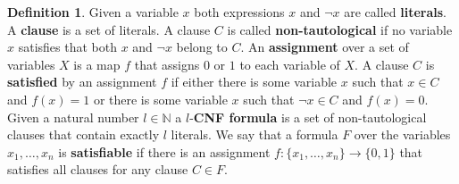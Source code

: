 \documentclass[12pt,notitlepage,a4paper]{article}
\theoremstyle{definition}
\newtheorem{definition}{Definition}[section]
\newcommand{\N}{\mathbb{N}}
\begin{document}
\begin{definition}\label{def:CNF}
Given a variable $x$ both expressions
$x$ and $\neg x$ are called \textbf{literals}. A \textbf{clause}
is a set of literals. A clause $C$ is called \textbf{non-tautological}
if no variable $x$ satisfies that both $x$ and $\neg x$
belong to $C$. An \textbf{assignment} over a set of variables $X$ is a 
map $f$ that assigns $0$ or $1$ to each variable of $X$. A clause $C$
is \textbf{satisfied} by an assignment $f$ if either there is some variable $x$
such that $x\in C$ and $f(x)=1$ or there is some variable $x$ such that
$\neg x\in C$ and $f(x)=0$. 
Given a natural number $l\in\N$
a $l$-\textbf{CNF formula} is a set of  non-tautological clauses 
that contain exactly $l$ literals. 
We say that a formula $F$
over the variables $x_1,\dots, x_n$ is \textbf{satisfiable} if there is an
assignment $f:\{x_1,\dots, x_n\}\rightarrow \{0,1\}$ that satisfies all clauses
for any clause $C\in F$. 
\end{definition}
\end{document}
